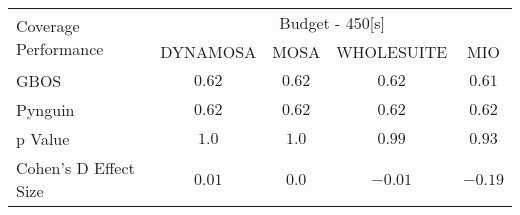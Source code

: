 \begin{tabular}{lcccc}\toprule 
\multirow{2}{*}{Coverage Performance} & \multicolumn{4}{c}{Budget - 450[s] } \\ \cmidrule(lr){2-5}  
                                      & DYNAMOSA&MOSA&WHOLESUITE&MIO                         \\ \midrule 
GBOS                                  & \(0.62\)&\(0.62\)&\(0.62\)&\(0.61\)                       \\ 
Pynguin                               & \(0.62\)&\(0.62\)&\(0.62\)&\(0.62\)                       \\ 
p Value                               & \(1.0\)&\(1.0\)&\(0.99\)&\(0.93\)                     \\ 
Cohen's D Effect Size                 & \(0.01\)&\(0.0\)&\(-0.01\)&\(-0.19\)                       \\ 
\bottomrule 
\end{tabular}